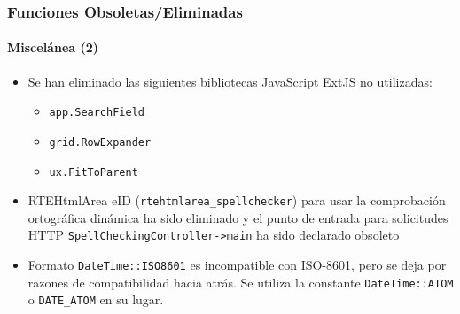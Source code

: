 \begin{frame}[fragile]
	\frametitle{Funciones Obsoletas/Eliminadas}
	\framesubtitle{Miscelánea (2)}

	\begin{itemize}

		\item Se han eliminado las siguientes bibliotecas JavaScript ExtJS no utilizadas:

			\begin{itemize}
				\item \texttt{app.SearchField}
				\item \texttt{grid.RowExpander}
				\item \texttt{ux.FitToParent}
			\end{itemize}

		\item RTEHtmlArea eID (\texttt{rtehtmlarea\_spellchecker}) para usar la comprobación ortográfica dinámica ha sido eliminado y el punto de entrada para solicitudes HTTP
			\texttt{SpellCheckingController->main} ha sido declarado obsoleto

		\item Formato \texttt{DateTime::ISO8601} es incompatible con ISO-8601,
			pero se deja por razones de compatibilidad hacia atrás.
			Se utiliza la constante \texttt{DateTime::ATOM} o \texttt{DATE\_ATOM} en su lugar.

	\end{itemize}

\end{frame}


